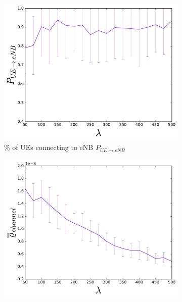 \begin{figure}
  \begin{subfigure}[b]{0.5\linewidth}
    \centering
    \captionsetup{justification=centering}
    \includegraphics[width=1\linewidth]{figures/WARD_2} 
    \caption{\% of UEs connecting to eNB $P_{UE\rightarrow eNB}$ }
    \label{fig:WARD_2} 
    \vspace{4ex}
  \end{subfigure}%
  \begin{subfigure}[b]{0.5\linewidth}
    \centering
    \captionsetup{justification=centering}
    \includegraphics[width=1\linewidth]{figures/WARD_8} 

\end{subfigure}
\end{figure}
